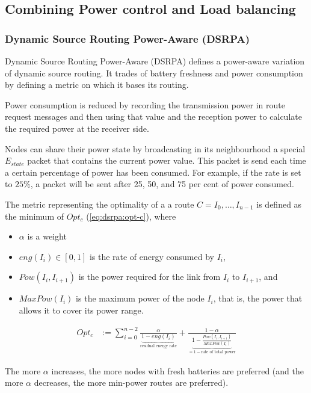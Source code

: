 \subsection{Combining Power control and Load balancing}

\subsubsection{Dynamic Source Routing Power-Aware (DSRPA)}
\label{dsrpa}
Dynamic Source Routing Power-Aware (DSRPA)\cite{djenouri2006new} defines a
power-aware variation of dynamic source routing.
 It trades of battery freshness and power consumption by defining a
metric on which it bases its routing.

Power consumption is reduced by recording the transmission power in route
request messages and then using that value and the reception power to calculate
the required power at the receiver side.

Nodes can share their power state by broadcasting in its neighbourhood a special
$E_{state}$ packet that contains the current power value. This packet is send
each time a certain percentage of power has been consumed. For example, if the
rate is set to $25\%$, a packet will be sent after 25, 50, and 75 per cent of
power consumed.

The metric representing the optimality of a a route $C=I_{0}, \ldots, I_{n-1}$
is defined as the minimum of $Opt_{c}$ (\ref{eq:dsrpa:opt-c}), where
\begin{itemize}
    \item $\alpha$ is a weight
    \item $eng(I_{i}) \in [0,1]$ is the rate of energy consumed by $I_{i}$,
    \item $Pow(I_{i}, I_{i+1})$ is the power required for the link from $I_{i}$ to $I_{i+1}$, and
    \item $MaxPow(I_{i})$ is the maximum power of the node $I_{i}$, that is, the power that allows
          it to cover its power range.
\end{itemize}

\begin{align}
Opt_{c} &:= \sum_{i=0}^{n-2} \frac{\alpha}{\underbrace{1-eng(I_{i})}_{\text{residual energy rate}}} + \frac{1-\alpha}{\underbrace{1-\frac{Pow(I_{i}, I_{i+1})}{MaxPow(I_{i})}}_{= 1 - \text{rate of total power}}}
\label{eq:dsrpa:opt-c}
\end{align} 


The more $\alpha$ increases, the more nodes with fresh batteries are preferred
(and the more $\alpha$ decreases, the more min-power routes are preferred).

